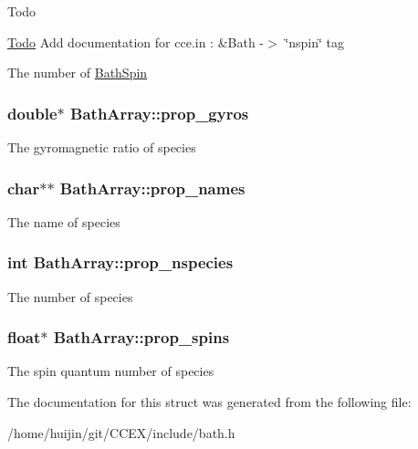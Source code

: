 \begin{DoxyRefDesc}{Todo}
\item[\hyperlink{todo__todo000011}{Todo}]Add documentation for cce.\-in \-: \&Bath -\/$>$ \char`\"{}nspin\char`\"{} tag \end{DoxyRefDesc}
The number of \hyperlink{structBathSpin}{Bath\-Spin} \hypertarget{structBathArray_a79ff244bc7666f22c2bbb8072d3e3fa2}{
\subsubsection[{prop\-\_\-gyros}]{\setlength{\rightskip}{0pt plus 5cm}double$\ast$ Bath\-Array\-::prop\-\_\-gyros}}\label{structBathArray_a79ff244bc7666f22c2bbb8072d3e3fa2}
The gyromagnetic ratio of species \hypertarget{structBathArray_a8349ee706336e916dd546a613fbb51e2}{
\subsubsection[{prop\-\_\-names}]{\setlength{\rightskip}{0pt plus 5cm}char$\ast$$\ast$ Bath\-Array\-::prop\-\_\-names}}\label{structBathArray_a8349ee706336e916dd546a613fbb51e2}
The name of species \hypertarget{structBathArray_a23c43fd398472286b1f80c5159896daf}{
\subsubsection[{prop\-\_\-nspecies}]{\setlength{\rightskip}{0pt plus 5cm}int Bath\-Array\-::prop\-\_\-nspecies}}\label{structBathArray_a23c43fd398472286b1f80c5159896daf}
The number of species \hypertarget{structBathArray_aca533199f1899634d7c1827864c89478}{
\subsubsection[{prop\-\_\-spins}]{\setlength{\rightskip}{0pt plus 5cm}float$\ast$ Bath\-Array\-::prop\-\_\-spins}}\label{structBathArray_aca533199f1899634d7c1827864c89478}
The spin quantum number of species 

The documentation for this struct was generated from the following file\-:\begin{DoxyCompactItemize}
\item 
/home/huijin/git/\-C\-C\-E\-X/include/bath.\-h\end{DoxyCompactItemize}
